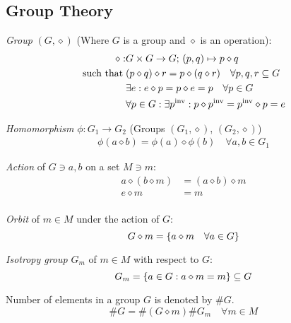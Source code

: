 		\subsection{Group Theory}
			\emph{Group} $(G, \diamond)$ (Where $G$ is a group and $\diamond$ is an operation):
			\begin{equation}
				\begin{aligned}
					\diamond: &G \times G \rightarrow G;\, (p,q) \mapsto p\diamond q \\
					\text{such that}\; &(p\diamond q)\diamond r = p\diamond (q\diamond r)\quad\forall{p,q,r}\subseteq G \\
					&\exists e: e\diamond p = p\diamond e = p\quad\forall p\in G\\
					&\forall p \in G: \exists {p}^\mathrm{inv}: p\diamond {p}^\mathrm{inv}= {p}^\mathrm{inv}\diamond p=e
				\end{aligned}
			\end{equation}
			
			\noindent
			\emph{Homomorphism} $\phi: G_1 \rightarrow G_2$ (Groups $(G_1,\diamond)$, $(G_2,\diamond)$)
			\begin{equation}
				\begin{aligned}
					\phi(a \diamond b) = \phi(a) \diamond \phi(b) \quad \forall a,b \in G_1
				\end{aligned}
			\end{equation}
			
			\noindent
			\emph{Action} of $G\ni a, b$ on a set $M\ni m$:
			\begin{equation}
				\begin{aligned}
					a\diamond (b\diamond m) &= (a \diamond b) \diamond m \\
					e \diamond m &= m \\
				\end{aligned}
			\end{equation}
			
			\noindent
			\emph{Orbit} of $m\in M$ under the action of $G$:
			\begin{equation}
				G \diamond m = \qty{ a\diamond m \quad \forall a \in G}
			\end{equation}

			\noindent
			\emph{Isotropy group} $G_m$ of $m\in M$ with respect to $G$:
			\begin{equation}
				G_m = \qty{a\in G: a\diamond m = m} \subseteq{G}
			\end{equation}			
			
			\noindent
			Number of elements in a group $G$ is denoted by $\# G$.
			\begin{equation}
				\# G = \#(G \diamond m) \#G_m \quad \forall m \in M
			\end{equation}

